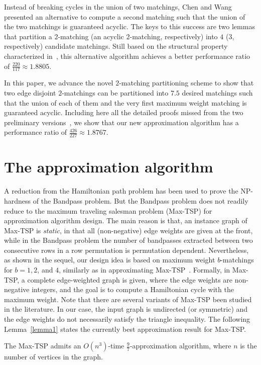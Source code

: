 \documentclass[11pt,twoside]{article}\usepackage{amssymb,latexsym,graphicx,hyperref}\usepackage{epstopdf}
\begin{document}
Instead of breaking cycles in the union of two matchings,
Chen and Wang~\cite{CW12} presented an alternative to compute a second matching such that the union of the two matchings is guaranteed acyclic.
The keys to this success are two lemmas that partition a $2$-matching (an acyclic $2$-matching, respectively)
into $4$ ($3$, respectively) candidate matchings.
Still based on the structural property characterized in~\cite{TGD12},
this alternative algorithm achieves a better performance ratio of $\frac {220}{117} \approx 1.8805$.


In this paper, we advance the novel $2$-matching partitioning scheme to show that two edge disjoint $2$-matchings
can be partitioned into $7.5$ desired matchings such that the union of each of them and the very first maximum weight matching is guaranteed acyclic.
Including here all the detailed proofs missed from the two preliminary versions~\cite{TGD12,CW12},
we show that our new approximation algorithm has a performance ratio of $\frac {426}{227} \approx 1.8767$.


\section{The approximation algorithm}
A reduction from the Hamiltonian path problem has been used to prove the NP-hardness of the Bandpass problem.
But the Bandpass problem does not readily reduce to the maximum traveling salesman problem (Max-TSP) \cite{GJ79} for approximation algorithm design.
The main reason is that, an instance graph of Max-TSP is {\em static}, in that all (non-negative) edge weights are given at the front,
while in the Bandpass problem the number of bandpasses extracted between two consecutive rows in a row permutation is permutation dependent.
Nevertheless, as shown in the sequel, our design idea is based on maximum weight $b$-matchings for $b = 1, 2$, and $4$,
similarly as in approximating Max-TSP~\cite{Ser84,HR00,COW05,PMM09}.
Formally, in Max-TSP, a complete edge-weighted graph is given, where the edge weights are non-negative integers,
and the goal is to compute a Hamiltonian cycle with the maximum weight.
Note that there are several variants of Max-TSP been studied in the literature.
In our case, the input graph is undirected (or symmetric) and the edge weights do not necessarily satisfy the triangle inequality.
The following Lemma~\ref{lemma1} states the currently best approximation result for Max-TSP.


\begin{lemma}
\label{lemma1}{\rm \cite{PMM09}}
The Max-TSP admits an $O(n^3)$-time $\frac 97$-approximation algorithm, where $n$ is the number of vertices in the graph.
\end{lemma}
\end{document}
